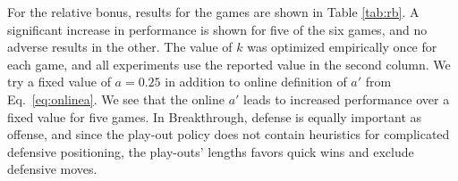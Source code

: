 \documentclass{ecai2014}
\begin{document}
\begin{table}
{\caption{Relative Bonus enabled using different search times, 5000 games} \label{tab:rb}}
\begin{center}
\tabcolsep=0.15cm
\end{center}
\end{table}
For the relative bonus, results for the games are shown in Table \ref{tab:rb}. A significant increase in performance is shown for five of the six games, and no adverse results in the other. The value of $k$ was optimized empirically once for each game, and all experiments use the reported value in the second column. 
We try a fixed value of $a = 0.25$ in addition to online definition of $a'$ from Eq.~\ref{eq:onlinea}. We see that the online $a'$ leads to increased performance over a fixed value for five games. In Breakthrough, defense is equally important as offense, and since the play-out policy does not contain heuristics for complicated defensive positioning, the play-outs' lengths favors quick wins and exclude defensive moves.
\end{document}
